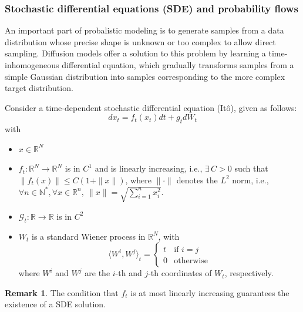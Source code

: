 \documentclass[a4paper,10pt]{article}
\theoremstyle{definition} %
\theoremstyle{definition} %
\theoremstyle{definition} %
\theoremstyle{definition} %
\newtheorem{remark}[definition]{Remark}
\newcommand{\0}{\boldsymbol{0}}
\begin{document}
\subsubsection{Stochastic differential equations (SDE) and probability flows}

An important part of probalistic modeling is to generate samples from a data distribution whose precise shape is unknown or too complex to allow direct sampling. Diffusion models offer a solution to this problem by learning a time-inhomogeneous differential equation, which gradually transforms samples from a simple Gaussian distribution into samples corresponding to the more complex target distribution.

Consider a time-dependent stochastic differential equation (Itô), given as follows:
    \begin{equation}\label{eq:SDE}
         dx_t = f_t(x_t)dt + g_tdW_t
    \end{equation}
    with 
    \begin{itemize}
        \item[] $x \in \mathbb{R}^N$
        
        \item[] $f_t : \mathbb{R}^N \rightarrow \mathbb{R}^N$ is in $C^1$ and is linearly increasing, i.e., $\exists\, C > 0$ such that $\|f_t(x)\| \leq C(1 + \|x\|)$, where $\|\cdot\|$ denotes the $L^2$ norm, i.e., $\forall n \in \mathbb{N}^*, \forall x \in \mathbb{R}^n,\ \|x\| = \sqrt{\sum\limits_{i=1}^n x_i^2}$.
        
        \item[] $\mathcal{G}_t : \mathbb{R} \rightarrow \mathbb{R}$ is in $C^2$
        
        \item[] $W_t$ is a standard Wiener process in $\mathbb{R}^N$, with
        \begin{equation*}
            \langle W^i, W^j \rangle_t =
            \begin{cases}
                t & \text{if } i = j \\
                0 & \text{otherwise}
            \end{cases}
        \end{equation*}
        where $W^i$ and $W^j$ are the $i$-th and $j$-th coordinates of $W_t$, respectively.
    \end{itemize}
    
    \begin{remark}
        The condition that $f_t$ is at most linearly increasing guarantees the existence of a SDE solution.
    \end{remark}
\end{document}
